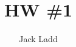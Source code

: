 \documentclass[12pt]{article}
\theoremstyle{definition}
\theoremstyle{remark}
\begin{document}
 

\title{HW \#1}
\author{Jack Ladd}

\maketitle
\end{document}
